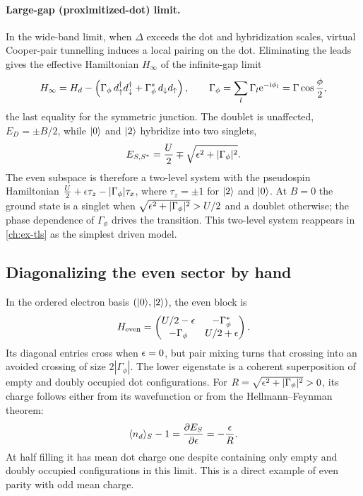 \paragraph{Large-gap (proximitized-dot) limit.}
In the wide-band limit, when $\Delta$ exceeds the dot and hybridization scales,
virtual Cooper-pair tunnelling induces a local
pairing on the dot. Eliminating the leads gives the effective
Hamiltonian $H_\infty$ of the infinite-gap limit~\cite{meng2009selfconsistent,karrasch2008josephson,zonda2023generalized}
\begin{equation}\label{eq:largegap}
  H_\infty=H_{d}-\left(\Gamma_\phi\,d_{\uparrow}^\dagger d_{\downarrow}^\dagger+\Gamma_\phi^*\,d_{\downarrow} d_{\uparrow}\right),
  \qquad \Gamma_\phi=\sum_l\Gamma_l\mathrm{e}^{-\mathrm{i}\phi_l}=\Gamma\cos\frac\phi2 ,
\end{equation}
the last equality for the symmetric junction. The doublet is unaffected, $E_D=\pm B/2$,
while $\lvert 0\rangle$ and $\lvert 2\rangle$ hybridize into two singlets,
\begin{equation}\label{eq:singlets}
  E_{S,S^*}=\frac U2\mp\sqrt{\epsilon^2+\lvert \Gamma_\phi\rvert^2}.
\end{equation}
The even subspace is therefore a two-level system with the pseudospin Hamiltonian
$\tfrac U2+\epsilon\tau_z-\lvert \Gamma_\phi\rvert\tau_x$, where $\tau_z=\pm1$ for $\lvert 2\rangle$ and
$\lvert 0\rangle$. At $B=0$ the ground state is a singlet when $\sqrt{\epsilon^2+\lvert \Gamma_\phi\rvert^2}>U/2$ and
a doublet otherwise; the phase dependence of $\Gamma_\phi$ drives the transition. This two-level
system reappears in \cref{ch:ex-tls} as the simplest driven model.

\subsection{Diagonalizing the even sector by hand}

In the ordered electron basis $(\lvert 0\rangle,\lvert 2\rangle)$, the even block is
\begin{equation}\label{eq:atomic-even-block}
 H_{\mathrm{even}}=
 \begin{pmatrix}U/2-\epsilon&-\Gamma_\phi^*\\-\Gamma_\phi&U/2+\epsilon\end{pmatrix}.
\end{equation}
Its diagonal entries cross when $\epsilon=0$, but pair mixing turns that crossing
into an avoided crossing of size $2|\Gamma_\phi|$. The lower eigenstate is a
coherent superposition of empty and doubly occupied dot configurations.
For $R=\sqrt{\epsilon^2+|\Gamma_\phi|^2}>0$, its charge follows either
from its wavefunction or from the Hellmann--Feynman theorem:
\begin{equation}
 \langle n_d\rangle_S-1=\frac{\partial E_S}{\partial\epsilon}=-\frac{\epsilon}{R}.
\end{equation}
At half filling it has mean dot charge one despite containing only empty and
doubly occupied configurations in this limit. This is a direct example of
even parity with odd mean charge.


